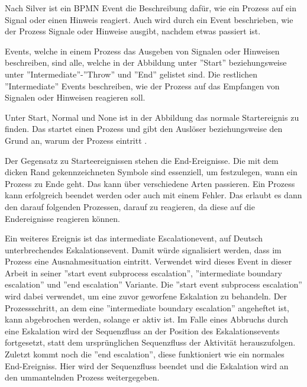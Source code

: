Nach Silver ist ein \ac{BPMN} Event die Beschreibung dafür, wie ein Prozess auf ein Signal oder einen Hinweis reagiert. Auch wird durch ein Event beschrieben, wie der Prozess Signale oder Hinweise ausgibt, nachdem etwas passiert ist. \citep[vgl.][S. 103]{bruce_bpmn_2012}

Events, welche in einem Prozess das Ausgeben von Signalen oder Hinweisen beschreiben, sind alle, welche in der Abbildung unter ''Start'' beziehungsweise unter ''Intermediate''-''Throw'' und ''End'' gelistet sind. Die restlichen ''Intermediate'' Events beschreiben, wie der Prozess auf das Empfangen von Signalen oder Hinweisen reagieren soll.

Unter Start, Normal und None ist in der Abbildung das normale Startereignis zu finden. Das startet einen Prozess und gibt den Auslöser beziehungsweise den Grund an, warum der Prozess eintritt \citep[vgl.][S. 49]{bruce_bpmn_2012}.

Der Gegensatz zu Starteereignissen stehen die End-Ereignisse. Die mit dem dicken Rand gekennzeichneten Symbole sind essenziell, um festzulegen, wann ein Prozess zu Ende geht. Das kann über verschiedene Arten passieren. Ein Prozess kann erfolgreich beendet werden oder auch mit einem Fehler. Das erlaubt es dann den darauf folgenden Prozessen, darauf zu reagieren, da diese auf die Endereignisse reagieren können. \citep[vgl.][S. 55f]{bruce_englisch_2011}

Ein weiteres Ereignis ist das intermediate Escalationevent, auf Deutsch unterbrechendes Eskalationsevent. Damit würde signalisiert werden, dass im Prozess eine Ausnahmesituation eintritt. Verwendet wird dieses Event in dieser Arbeit in seiner ''start event subprocess escalation'', ''intermediate boundary escalation'' und ''end escalation'' Variante. Die ''start event subprocess escalation'' wird dabei verwendet, um eine zuvor geworfene Eskalation zu behandeln. Der Prozessschritt, an dem eine ''intermediate boundary escalation'' angeheftet ist, kann abgebrochen werden, solange er aktiv ist. Im Falle eines Abbruchs durch eine Eskalation wird der Sequenzfluss an der Position des Eskalationsevents fortgesetzt, statt dem ursprünglichen Sequenzfluss der Aktivität herauszufolgen. Zuletzt kommt noch die ''end escalation'', diese funktioniert wie ein normales End-Ereigniss. Hier wird der Sequenzfluss beendet und die Eskalation wird an den ummantelnden Prozess weitergegeben. \citep[vgl.][S. 107, 111f]{bruce_englisch_2011}

